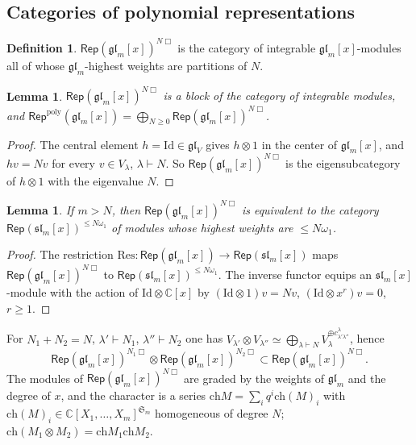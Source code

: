 \documentclass[11pt]{amsart}
\numberwithin{equation}{section}
\newtheorem{lemma}[equation]{Lemma}
\theoremstyle{definition}
\newtheorem{definition}[equation]{Definition}
\newcommand{\gl}{\mathfrak{gl}}
\newcommand{\ch}{\mathrm{ch}}
\newcommand{\Rep}{\mathsf{Rep}}
\begin{document}
	\subsection{Categories of polynomial representations}\label{ssec:app-categories}
	
	\begin{definition}
		$\Rep(\gl_m[x])^{N\Box}$ is the category of integrable $\gl_m[x]$-modules all of whose $\gl_m$-highest weights are partitions of $N$.
	\end{definition}
	
	\begin{lemma}
		$\Rep(\gl_m[x])^{N\Box}$ is a block of the category of integrable modules, and $\Rep^{\mathrm{poly}}(\gl_m[x])=\bigoplus_{N\ge0}\Rep(\gl_m[x])^{N\Box}$.
	\end{lemma}
	\begin{proof}
		The central element $h=\mathrm{Id}\in\gl_V$ gives $h\otimes1$ in the center of $\gl_m[x]$, and $hv=Nv$ for every $v\in V_\lambda$, $\lambda\vdash N$. So $\Rep(\gl_m[x])^{N\Box}$ is the eigensubcategory of $h\otimes1$ with the eigenvalue $N$.
	\end{proof}
	
	\begin{lemma}
		If $m>N$, then $\Rep(\gl_m[x])^{N\Box}$ is equivalent to the category $\Rep(\mathfrak{sl}_m[x])^{\le N\omega_1}$ of modules whose highest weights are $\le N\omega_1$.
	\end{lemma}
	\begin{proof}
		The restriction $\mathrm{Res}\colon\Rep(\gl_m[x])\to\Rep(\mathfrak{sl}_m[x])$ maps $\Rep(\gl_m[x])^{N\Box}$ to $\Rep(\mathfrak{sl}_m[x])^{\le N\omega_1}$. The inverse functor equips an $\mathfrak{sl}_m[x]$-module with the action of $\mathrm{Id}\otimes\mathbb{C}[x]$ by $(\mathrm{Id}\otimes1)v=Nv$, $(\mathrm{Id}\otimes x^r)v=0$, $r\ge1$.
	\end{proof}
	
	For $N_1+N_2=N$, $\lambda'\vdash N_1$, $\lambda''\vdash N_2$ one has $V_{\lambda'}\otimes V_{\lambda''}\simeq\bigoplus_{\lambda\vdash N}V_\lambda^{\oplus c^\lambda_{\lambda'\lambda''}}$, hence $$\Rep(\gl_m[x])^{N_1\Box}\otimes\Rep(\gl_m[x])^{N_2\Box}\subset\Rep(\gl_m[x])^{N\Box}.$$ 
	The modules of $\Rep(\gl_m[x])^{N\Box}$ are graded by the weights of $\gl_m$ and the degree of $x$, and the character is a series $\ch M=\sum_iq^i\ch(M)_i$ with $\ch(M)_i\in\mathbb{C}[X_1,\dots,X_m]^{\mathfrak S_m}$ homogeneous of degree $N$; $\ch(M_1\otimes M_2)=\ch M_1\ch M_2$.
	
\end{document}

